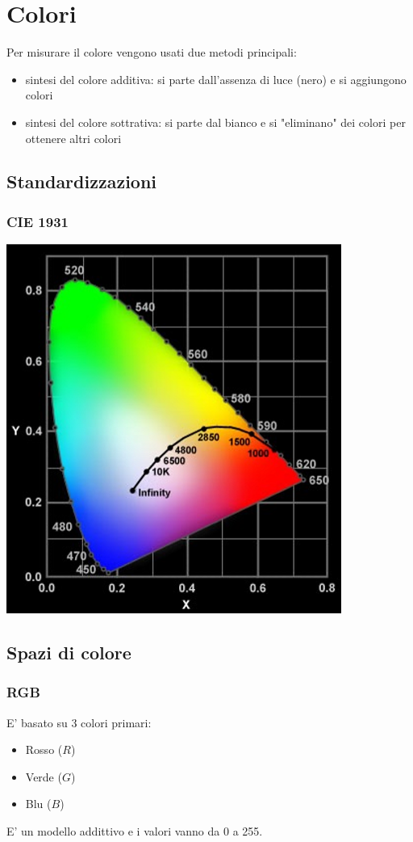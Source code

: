 \documentclass[12pt, a4paper]{report}
\begin{document}
\section{Colori}
Per misurare il colore vengono usati due metodi principali:
\begin{itemize}
    \item sintesi del colore additiva: si parte dall'assenza di luce (nero) e si aggiungono colori
    \item sintesi del colore sottrativa: si parte dal bianco e si "eliminano" dei colori per ottenere altri colori
\end{itemize}
\subsection{Standardizzazioni}
\subsubsection{CIE 1931}
\begin{center}
    \includegraphics[width=.7\textwidth]{Immagini/cie1931.png}
\end{center}
\subsection{Spazi di colore}
\subsubsection{RGB}
E' basato su 3 colori primari:
\begin{itemize}
    \item Rosso ($R$)
    \item Verde ($G$)
    \item Blu ($B$)
\end{itemize}
E' un modello addittivo e i valori vanno da 0 a 255.
\end{document}
